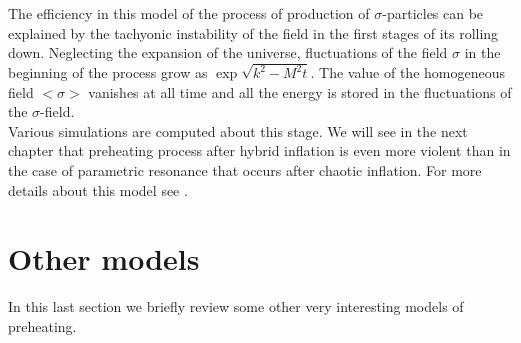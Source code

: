 \documentclass[11pt,a4paper,twoside]{book}
\begin{document}
The efficiency in this model of the process of production of $\sigma$-particles can be explained by the tachyonic instability of the field in the first stages of its rolling down. Neglecting the expansion of the universe, fluctuations of the field $\sigma$ in the beginning of the process grow as $\exp \sqrt{k^{2}-M^{2}t}$. The value of the homogeneous field $ <\sigma> $ vanishes at all time and all the energy is stored in the fluctuations of the $\sigma$-field.\\
Various simulations  are computed about this stage. We will see in the next chapter that preheating process after hybrid inflation is even more violent  than in the case of parametric resonance that occurs after chaotic inflation. For more details about this model see \cite{Chap4:TachyonicPreheating}.
\section{Other models}
In this last section we briefly review some other very interesting models of preheating.
\end{document}

